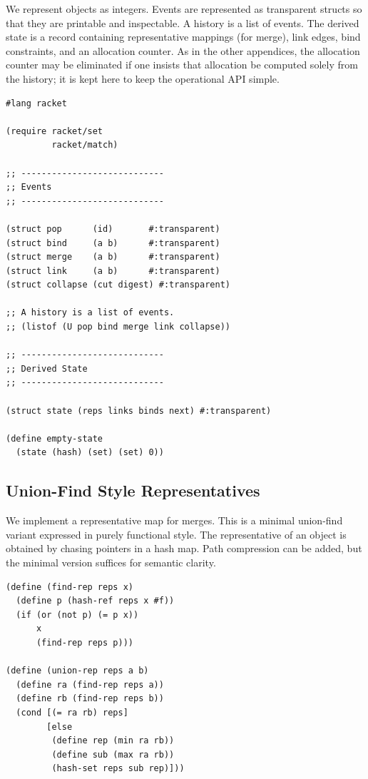\documentclass[11pt]{article}
\begin{document}
We represent objects as integers. Events are represented as transparent structs
so that they are printable and inspectable. A history is a list of events. The
derived state is a record containing representative mappings (for merge), link
edges, bind constraints, and an allocation counter. As in the other appendices,
the allocation counter may be eliminated if one insists that allocation be
computed solely from the history; it is kept here to keep the operational API
simple.

\begin{verbatim}
#lang racket

(require racket/set
         racket/match)

;; ----------------------------
;; Events
;; ----------------------------

(struct pop      (id)       #:transparent)
(struct bind     (a b)      #:transparent)
(struct merge    (a b)      #:transparent)
(struct link     (a b)      #:transparent)
(struct collapse (cut digest) #:transparent)

;; A history is a list of events.
;; (listof (U pop bind merge link collapse))

;; ----------------------------
;; Derived State
;; ----------------------------

(struct state (reps links binds next) #:transparent)

(define empty-state
  (state (hash) (set) (set) 0))
\end{verbatim}

\subsection{Union-Find Style Representatives}

We implement a representative map for merges. This is a minimal union-find
variant expressed in purely functional style. The representative of an object is
obtained by chasing pointers in a hash map. Path compression can be added, but
the minimal version suffices for semantic clarity.

\begin{verbatim}
(define (find-rep reps x)
  (define p (hash-ref reps x #f))
  (if (or (not p) (= p x))
      x
      (find-rep reps p)))

(define (union-rep reps a b)
  (define ra (find-rep reps a))
  (define rb (find-rep reps b))
  (cond [(= ra rb) reps]
        [else
         (define rep (min ra rb))
         (define sub (max ra rb))
         (hash-set reps sub rep)]))
\end{verbatim}
\end{document}
